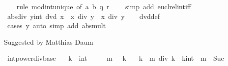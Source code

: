 \begin{isabellebody}
%
\isadelimproof
\ \ %
\endisadelimproof
%
\isatagproof
{}\isamarkupfalse%
\ {\isacharparenleft}{\kern0pt}rule\ mod{\isacharunderscore}{\kern0pt}int{\isacharunderscore}{\kern0pt}unique\ {\isacharbrackleft}{\kern0pt}of\ a\ b\ q\ r{\isacharbrackright}{\kern0pt}{\isacharcomma}{\kern0pt}\isanewline
\ \ \ \ simp\ add{\isacharcolon}{\kern0pt}\ eucl{\isacharunderscore}{\kern0pt}rel{\isacharunderscore}{\kern0pt}int{\isacharunderscore}{\kern0pt}iff{\isacharparenright}{\kern0pt}%
\endisatagproof
{\isafoldproof}%
%
\isadelimproof
\isanewline
%
\endisadelimproof
\isanewline
{}\isamarkupfalse%
\ abs{\isacharunderscore}{\kern0pt}div{\isacharcolon}{\kern0pt}\ {\isachardoublequoteopen}{\isacharparenleft}{\kern0pt}y{\isacharcolon}{\kern0pt}{\isacharcolon}{\kern0pt}int{\isacharparenright}{\kern0pt}\ dvd\ x\ {\isasymLongrightarrow}\ {\isasymbar}x\ div\ y{\isasymbar}\ {\isacharequal}{\kern0pt}\ {\isasymbar}x{\isasymbar}\ div\ {\isasymbar}y{\isasymbar}{\isachardoublequoteclose}\isanewline
%
\isadelimproof
\ \ %
\endisadelimproof
%
\isatagproof
{}\isamarkupfalse%
\ dvd{\isacharunderscore}{\kern0pt}def\ \isamarkupfalse%
\ {\isacharparenleft}{\kern0pt}cases\ {\isachardoublequoteopen}y{\isacharequal}{\kern0pt}{}{\isachardoublequoteclose}{\isacharparenright}{\kern0pt}\ {\isacharparenleft}{\kern0pt}auto\ simp\ add{\isacharcolon}{\kern0pt}\ abs{\isacharunderscore}{\kern0pt}mult{\isacharparenright}{\kern0pt}%
\endisatagproof
{\isafoldproof}%
%
\isadelimproof
%
\endisadelimproof
%
\begin{isamarkuptext}%
Suggested by Matthias Daum%
\end{isamarkuptext}\isamarkuptrue%
\isamarkupfalse%
\ int{\isacharunderscore}{\kern0pt}power{\isacharunderscore}{\kern0pt}div{\isacharunderscore}{\kern0pt}base{\isacharcolon}{\kern0pt}\isanewline
\ \ \ k\ {\isacharcolon}{\kern0pt}{\isacharcolon}{\kern0pt}\ int\isanewline
\ \ \ {\isachardoublequoteopen}{}\ {\isacharless}{\kern0pt}\ m{\isachardoublequoteclose}\ {\isachardoublequoteopen}{}\ {\isacharless}{\kern0pt}\ k{\isachardoublequoteclose}\isanewline
\ \ \ {\isachardoublequoteopen}k\ {\isacharcircum}{\kern0pt}\ m\ div\ k\ {\isacharequal}{\kern0pt}\ {\isacharparenleft}{\kern0pt}k{\isacharcolon}{\kern0pt}{\isacharcolon}{\kern0pt}int{\isacharparenright}{\kern0pt}\ {\isacharcircum}{\kern0pt}\ {\isacharparenleft}{\kern0pt}m\ {\isacharminus}{\kern0pt}\ Suc\ {}{\isacharparenright}{\kern0pt}{\isachardoublequoteclose}\isanewline

\end{isabellebody}
